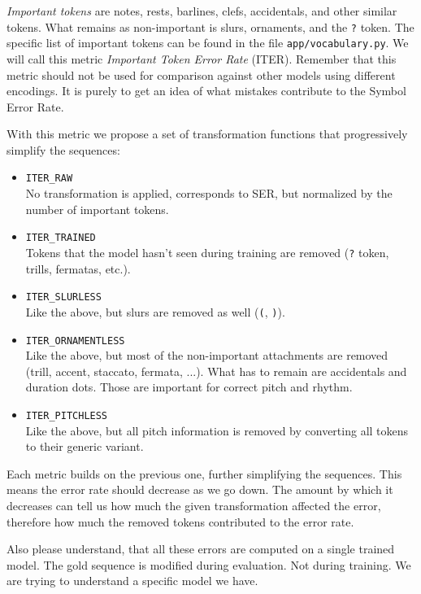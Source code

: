 \emph{Important tokens} are notes, rests, barlines, clefs, accidentals, and other similar tokens. What remains as non-important is slurs, ornaments, and the \verb`?` token. The specific list of important tokens can be found in the file \verb`app/`\allowbreak\verb`voca`\allowbreak\verb`bula`\allowbreak\verb`ry.py`. We will call this metric \emph{Important Token Error Rate} (ITER). Remember that this metric should not be used for comparison against other models using different encodings. It is purely to get an idea of what mistakes contribute to the Symbol Error Rate.

With this metric we propose a set of transformation functions that progressively simplify the sequences:

\begin{itemize}
\item \verb`ITER_RAW` \\ No transformation is applied, corresponds to SER, but normalized by the number of important tokens.
\item \verb`ITER_TRAINED` \\ Tokens that the model hasn't seen during training are removed (\verb`?` token, trills, fermatas, etc.).
\item \verb`ITER_SLURLESS` \\ Like the above, but slurs are removed as well (\verb`(`, \verb`)`).
\item \verb`ITER_ORNAMENTLESS` \\ Like the above, but most of the non-important attachments are removed (trill, accent, staccato, fermata, ...). What has to remain are accidentals and duration dots. Those are important for correct pitch and rhythm.
\item \verb`ITER_PITCHLESS` \\ Like the above, but all pitch information is removed by converting all tokens to their generic variant.
\end{itemize}

Each metric builds on the previous one, further simplifying the sequences. This means the error rate should decrease as we go down. The amount by which it decreases can tell us how much the given transformation affected the error, therefore how much the removed tokens contributed to the error rate.

Also please understand, that all these errors are computed on a single trained model. The gold sequence is modified during evaluation. Not during training. We are trying to understand a specific model we have.


